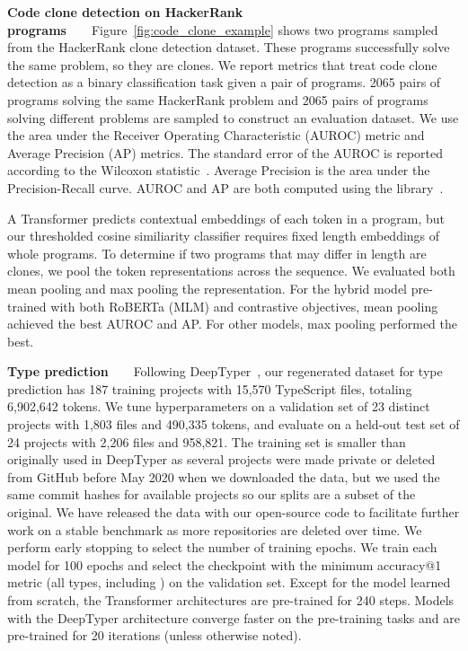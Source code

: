\documentclass[11pt]{article}
\newcommand{\thou}[0]{}
\begin{document}
\textbf{Code clone detection on HackerRank programs}~~~~Figure~\ref{fig:code_clone_example} shows two programs sampled from the HackerRank clone detection dataset. These programs successfully solve the same problem, so they are clones. We report metrics that treat code clone detection as a binary classification task given a pair of programs. 2065 pairs of programs solving the same HackerRank problem and 2065 pairs of programs solving different problems are sampled to construct an evaluation dataset. We use the area under the Receiver Operating Characteristic (AUROC) metric and Average Precision (AP) metrics. The standard error of the AUROC is reported according to the Wilcoxon statistic~\cite{10.5555/1089508.1089530}. Average Precision is the area under the Precision-Recall curve. AUROC and AP are both computed using the  library~\cite{scikit-learn}.

A Transformer predicts contextual embeddings of each token in a program, but our thresholded cosine similiarity classifier requires fixed length embeddings of whole programs. To determine if two programs that may differ in length are clones, we pool the token representations across the sequence. We evaluated both mean pooling and max pooling the representation. For the hybrid model pre-trained with both RoBERTa (MLM) and contrastive objectives, mean pooling achieved the best AUROC and AP. For other models, max pooling performed the best.

\textbf{Type prediction}~~~~Following DeepTyper~\citep{hellendoorn2018deep}, our regenerated dataset for type prediction has
187 training projects with 15,570 TypeScript files, totaling 6,902,642 tokens. We tune hyperparameters on a validation set of 23 distinct projects with 1,803 files and 490,335 tokens, and evaluate on a held-out test set of 24 projects with 2,206 files and 958,821. The training set is smaller than originally used in DeepTyper as several projects were made private or deleted from GitHub before May 2020 when we downloaded the data, but we used the same commit hashes for available projects so our splits are a subset of the original. We have released the data with our open-source code to facilitate further work on a stable benchmark as more repositories are deleted over time. We perform early stopping to select the number of training epochs. We train each model for 100 epochs and select the checkpoint with the minimum accuracy@1 metric (all types, including ) on the validation set. Except for the model learned from scratch, the Transformer architectures are pre-trained for 240\thou{} steps. Models with the DeepTyper architecture converge faster on the pre-training tasks and are pre-trained for 20\thou{} iterations (unless otherwise noted).
\end{document}

